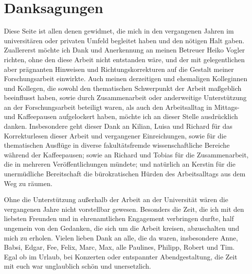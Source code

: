\documentclass[document.tex]{subfiles}
\begin{document}
    \chapter*{Danksagungen}
    Diese Seite ist allen denen gewidmet, die mich in den vergangenen Jahren im universitären oder privaten Umfeld begleitet haben und den nötigen Halt gaben.
    Zuallererst möchte ich Dank und Anerkennung an meinen Betreuer Heiko Vogler richten, ohne den diese Arbeit nicht entstanden wäre, und der mit gelegentlichen aber prägnanten Hinweisen und Richtungskorrekturen auf die Gestalt meiner Forschungsarbeit einwirkte.
    Auch meinen derzeitigen und ehemaligen Kolleginnen und Kollegen, die sowohl den thematischen Schwerpunkt der Arbeit maßgeblich beeinflusst haben, sowie durch Zusammenarbeit oder anderweitige Unterstützung an der Forschungsarbeit beteiligt waren, als auch den Arbeitsalltag in Mittags- und Kaffeepausen aufgelockert haben, möchte ich an dieser Stelle ausdrücklich danken.
    Insbesondere geht dieser Dank an Kilian, Luisa und Richard für das Korrekturlesen dieser Arbeit und vergangener Einreichungen, sowie für die thematischen Ausflüge in diverse fakultätsfremde wissenschaftliche Bereiche während der Kaffeepausen; sowie an Richard und Tobias für die Zusammenarbeit, die in mehreren Veröffentlichungen mündete; und natürlich an Kerstin für die unermüdliche Bereitschaft die bürokratischen Hürden des Arbeitsalltags aus dem Weg zu räumen.

    Ohne die Unterstützung außerhalb der Arbeit an der Universität wären die vergangenen Jahre nicht vorstellbar gewesen.
    Besonders die Zeit, die ich mit den liebsten Freunden und in ehrenamtlichen Engagement verbringen durfte, half ungemein von den Gedanken, die sich um die Arbeit kreisen, abzuschalten und mich zu erholen.
    Vielen lieben Dank an alle, die da waren, insbesondere Anne, Babsi, Edgar, Fee, Felix, Marc, Max, alle Paulines, Philipp, Robert und Tim.
    Egal ob im Urlaub, bei Konzerten oder entspannter Abendgestaltung, die Zeit mit euch war unglaublich schön und unersetzlich.
\end{document}
